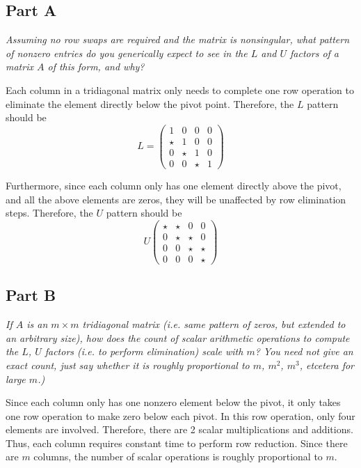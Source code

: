 \documentclass{article}
\begin{document}
\subsection*{Part A}

\textit{Assuming no row swaps are required and the matrix is nonsingular, what
pattern of nonzero entries do you generically expect to see in the $L$ and
$U$ factors of a matrix $A$ of this form, and why?}

\bigbreak

Each column in a tridiagonal matrix only needs to complete one row operation to
eliminate the element directly below the pivot point. Therefore, the $ L $
pattern should be
\[
    L = \begin{pmatrix}
        1 & 0 & 0 & 0 \\
        \star & 1 & 0 & 0 \\
        0 & \star & 1 & 0 \\
        0 & 0 & \star & 1
    \end{pmatrix}
\]

Furthermore, since each column only has one element directly above the pivot,
and all the above elements are zeros, they will be unaffected by row elimination
steps. Therefore, the $ U $ pattern should be
\[
    U \begin{pmatrix}
        \star & \star & 0 & 0 \\
        0 & \star & \star & 0 \\
        0 & 0 & \star & \star \\
        0 & 0 & 0 & \star
    \end{pmatrix}
\]

\subsection*{Part B}

\textit{If $A$ is an $m \times m$ tridiagonal matrix (i.e. same pattern of
zeros, but extended to an arbitrary size), how does the count of scalar
arithmetic operations to compute the $ L $, $U$ factors (i.e. to perform
elimination) scale with $m$?  You need not give an exact count, just say whether
it is roughly proportional to $m$, $m^2$, $m^3$, etcetera for large $m$.)}

\bigbreak

Since each column only has one nonzero element below the pivot, it only takes
one row operation to make zero below each pivot. In this row operation, only
four elements are involved. Therefore, there are 2 scalar multiplications and
additions. Thus, each column requires constant time to perform row reduction.
Since there are $ m $ columns, the number of scalar operations is roughly
proportional to $ m $.
\end{document}
